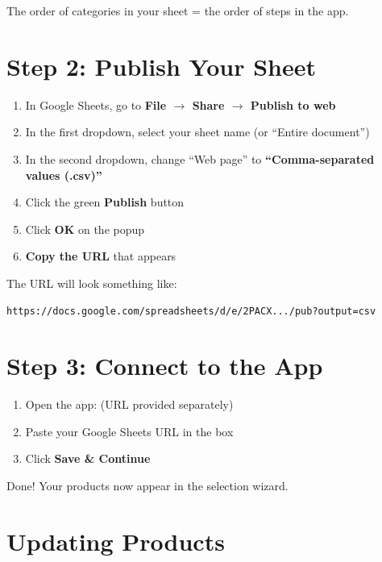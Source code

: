 \documentclass[11pt,letterpaper]{article}
\begin{document}
The order of categories in your sheet = the order of steps in the app.

\newpage

\section*{Step 2: Publish Your Sheet}

\begin{enumerate}[leftmargin=*]
    \item In Google Sheets, go to \textbf{File $\rightarrow$ Share $\rightarrow$ Publish to web}
    \item In the first dropdown, select your sheet name (or ``Entire document'')
    \item In the second dropdown, change ``Web page'' to \textbf{``Comma-separated values (.csv)''}
    \item Click the green \textbf{Publish} button
    \item Click \textbf{OK} on the popup
    \item \textbf{Copy the URL} that appears
\end{enumerate}

The URL will look something like:

\begin{center}
\texttt{https://docs.google.com/spreadsheets/d/e/2PACX.../pub?output=csv}
\end{center}

\section*{Step 3: Connect to the App}

\begin{enumerate}[leftmargin=*]
    \item Open the app: \textbf{\underline{\hspace{6cm}}} {\small (URL provided separately)}
    \item Paste your Google Sheets URL in the box
    \item Click \textbf{Save \& Continue}
\end{enumerate}

Done! Your products now appear in the selection wizard.

\section*{Updating Products}
\end{document}

